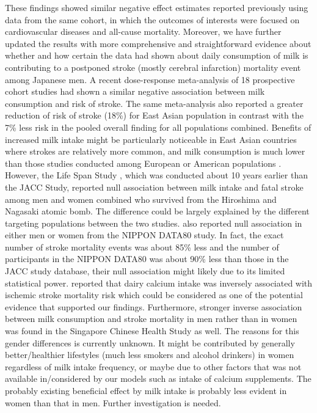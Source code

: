 \documentclass[nutrients,article,submitted,moreauthors,pdftex]{mdpi}
\begin{document}
These findings showed similar negative effect estimates reported
previously \citep{wang_milk_2015} using data from the same cohort, in
which the outcomes of interests were focused on cardiovascular diseases
and all-cause mortality. Moreover, we have further updated the results
with more comprehensive and straightforward evidence about whether and
how certain the data had shown about daily consumption of milk is
contributing to a postponed stroke (mostly cerebral infarction)
mortality event among Japanese men. A recent dose-response meta-analysis
of 18 prospective cohort studies had shown a similar negative
association \citep{DeGoede2016} between milk consumption and risk of
stroke. The same meta-analysis also reported a greater reduction of risk
of stroke (18\%) for East Asian population in contrast with the 7\% less
risk in the pooled overall finding for all populations combined.
Benefits of increased milk intake might be particularly noticeable in
East Asian countries where strokes are relatively more common, and milk
consumption is much lower than those studies conducted among European or
American populations \citep{dehghan2018association}. However, the Life
Span Study \citep{sauvaget2003intake}, which was conducted about 10
years earlier than the JACC Study, reported null association between
milk intake and fatal stroke among men and women combined who survived
from the Hiroshima and Nagasaki atomic bomb. The difference could be
largely explained by the different targeting populations between the two
studies. \citet{kondo2013consumption} also reported null association in
either men or women from the NIPPON DATA80 study. In fact, the exact
number of stroke mortality events was about 85\% less and the number of
participants in the NIPPON DATA80 was about 90\% less than those in the
JACC study database, their null association might likely due to its
limited statistical power. \citet{umesawa2008dietary} reported that
dairy calcium intake was inversely associated with ischemic stroke
mortality risk which could be considered as one of the potential
evidence that supported our findings. Furthermore, stronger inverse
association between milk consumption and stroke mortality in men rather
than in women was found in the Singapore Chinese Health Study
\citep{Talaei_2016} as well. The reasons for this gender differences is
currently unknown. It might be contributed by generally better/healthier
lifestyles (much less smokers and alcohol drinkers) in women regardless
of milk intake frequency, or maybe due to other factors that was not
available in/considered by our models such as intake of calcium
supplements. The probably existing beneficial effect by milk intake is
probably less evident in women than that in men. Further investigation
is needed.
\end{document}
